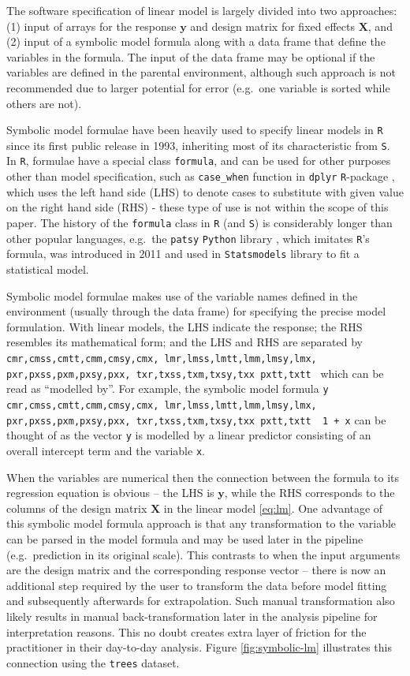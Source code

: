 \documentclass[runningheads]{llncs}\usepackage[]{graphicx}\usepackage[]{color}
\makeatletter
\newcommand\midtilde@raisedtilde[1][.5]{\raisebox{#1ex}{\texttildelow}}
\def\midtilde@normaltilde{\texttildelow}
\newcommand\midtilde%
{%
  \expandafter\in@\expandafter{\f@family}%
    {cmr,cmss,cmtt,cmm,cmsy,cmx,%
    lmr,lmss,lmtt,lmm,lmsy,lmx,%
    pxr,pxss,pxm,pxsy,pxx,%
    txr,txss,txm,txsy,txx}%
  \ifin@%
    \midtilde@raisedtilde%
  \else%
    \expandafter\in@\expandafter{\f@family}%
    {pxtt,txtt}%
    \ifin@%
      \midtilde@raisedtilde[.35]%
    \else%
      \midtilde@normaltilde%
    \fi%
  \fi%
}
\makeatother
\begin{document}
The software specification of linear model is largely divided into two approaches: (1) input of arrays for the response \(\boldsymbol{y}\) and design matrix for fixed effects \(\mathbf{X}\), and (2) input of a symbolic model formula along with a data frame that define the variables in the formula. The input of the data frame may be optional if the variables are defined in the parental environment, although such approach is not recommended due to larger potential for error (e.g.~one variable is sorted while others are not).

Symbolic model formulae have been heavily used to specify linear models in \texttt{R} since its first public release in 1993, inheriting most of its characteristic from \texttt{S}. In \texttt{R}, formulae have a special class \texttt{formula}, and can be used for other purposes other than model specification, such as \texttt{case\_when} function in \texttt{dplyr} \texttt{R}-package \citep{dplyr}, which uses the left hand side (LHS) to denote cases to substitute with given value on the right hand side (RHS) - these type of use is not within the scope of this paper. The history of the \texttt{formula} class in \texttt{R} (and \texttt{S}) is considerably longer than other popular languages, e.g.~the \texttt{patsy} \texttt{Python} library \citep{patsy}, which imitates \texttt{R}'s formula, was introduced in 2011 and used in \texttt{Statsmodels} library \citep{seabold2010statsmodels} to fit a statistical model.

Symbolic model formulae makes use of the variable names defined in the environment (usually through the data frame) for specifying the precise model formulation. With linear models, the LHS indicate the response; the RHS resembles its mathematical form; and the LHS and RHS are separated by \texttt{\midtilde} which can be read as ``modelled by''. For example, the symbolic model formula \texttt{y \midtilde\ 1 + x} can be thought of as the vector \texttt{y} is modelled by a linear predictor consisting of an overall intercept term and the variable \texttt{x}.

When the variables are numerical then the connection between the formula to its regression equation is obvious -- the LHS is \(\boldsymbol{y}\), while the RHS corresponds to the columns of the design matrix \(\mathbf{X}\) in the linear model \eqref{eq:lm}. One advantage of this symbolic model formula approach is that any transformation to the variable can be parsed in the model formula and may be used later in the pipeline (e.g.~prediction in its original scale). This contrasts to when the input arguments are the design matrix and the corresponding response vector -- there is now an additional step required by the user to transform the data before model fitting and subsequently afterwards for extrapolation. Such manual transformation also likely results in manual back-transformation later in the analysis pipeline for interpretation reasons. This no doubt creates extra layer of friction for the practitioner in their day-to-day analysis. Figure \ref{fig:symbolic-lm} illustrates this connection using the \texttt{trees} dataset.
\end{document}
